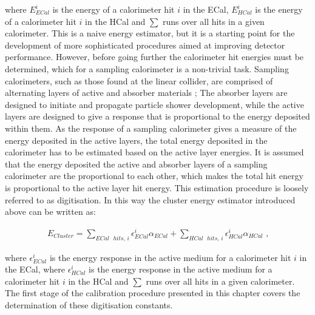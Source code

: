 \noindent where $E^{i}_{ECal}$ is the energy of a calorimeter hit $i$ in the ECal, $E^{i}_{HCal}$ is the energy of a calorimeter hit $i$ in the HCal and $\sum$ runs over all hits in a given calorimeter.  This is a naive energy estimator, but it is a starting point for the development of more sophisticated procedures aimed at improving detector performance.  However, before going further the calorimeter hit energies must be determined, which for a sampling calorimeter is a non-trivial task.  Sampling calorimeters, such as those found at the linear collider, are comprised of alternating layers of active and absorber materials \cite{Fabjan:2003aq};  The absorber layers are designed to initiate and propagate particle shower development, while the active layers are designed to give a response that is proportional to the energy deposited within them.  As the response of a sampling calorimeter gives a measure of the energy deposited in the active layers, the total energy deposited in the calorimeter has to be estimated based on the active layer energies.  It is assumed that the energy deposited the active and absorber layers of a sampling calorimeter are the proportional to each other, which makes the total hit energy is proportional to the active layer hit energy.  This estimation procedure is loosely referred to as digitisation.  In this way the cluster energy estimator introduced above can be written as:

\begin{equation}
\begin{aligned}
E_{Cluster} = \sum_{ECal \text{ } hits \text{, }i} \epsilon^{i}_{ECal} \alpha_{ECal} + \sum_{HCal \text{ } hits \text{, }i} \epsilon^{i}_{HCal} \alpha_{HCal} \text{ ,}
\end{aligned}
\end{equation}

\noindent where $\epsilon^{i}_{ECal}$ is the energy response in the active medium for a calorimeter hit $i$ in the ECal, where $\epsilon^{i}_{HCal}$ is the energy response in the active medium for a calorimeter hit $i$ in the HCal and $\sum$ runs over all hits in a given calorimeter.  The first stage of the calibration procedure presented in this chapter covers the determination of these digitisation constants.  

